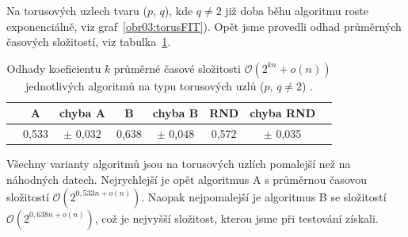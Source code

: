 Na torusových uzlech tvaru ($p$, $q$), kde $q\neq 2$ již doba běhu algoritmu roste exponenciálně, viz graf~\ref{obr03:torusFIT}). Opět jsme provedli odhad průměrných časových složitostí, viz tabulka~\ref{torustab}.

\begin{table}[t]
\centering
  \begin{tabular}{*{8}{c}}
    \toprule
       & A & chyba A & B & chyba B &  RND & chyba RND \\ 
    \midrule
      & 0,533 & $\pm$ 0,032  &   0,638 & $\pm$ 0,048   &  0,572 & $\pm$ 0,035\\
    \bottomrule
  \end{tabular}
    \caption{Odhady koeficientu $k$ průměrné časové složitosti $\mathcal{O}\left(2^{kn} + o(n)\right)$ jednotlivých algoritmů na typu torusových uzlů ($p$, $q\neq 2$) .} \label{torustab}
    
\end{table}

Všechny varianty algoritmů jsou na torusových uzlích pomalejší než na náhodných datech. Nejrychlejší je opět algoritmus A s průměrnou časovou složitostí $\mathcal{O}\left(2^{0,533 n + o(n)}\right)$. Naopak nejpomalejší je algoritmus B se složitostí $\mathcal{O}\left(2^{0,638 n + o(n)}\right)$, což je nejvyšší složitost, kterou jsme při testování získali.
